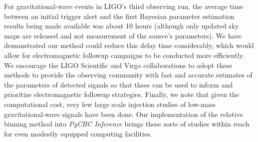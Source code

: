For gravitational-wave events in LIGO's third observing run, the average time between an initial trigger alert and the first Bayesian parameter estimation results being made available was about 10 hours (although only updated sky maps are released and not measurement of the source's parameters). We have demonstrated  our method could reduce this delay time considerably, which would allow for electromagnetic followup campaigns to be conducted more efficiently.   We encourage the LIGO Scientific and Virgo collaborations to adopt these methods to provide the observing community with fast and accurate estimates of the parameters of detected signals so that these can be used to inform and prioritize electromagnetic followup strategies. Finally, we note that given the computational cost, very few large scale injection studies of low-mass gravitational-wave signals have been done. Our implementation of the relative binning method into \textit{PyCBC Inference} brings these sorts of studies within reach for even modestly equipped computing facilities.

